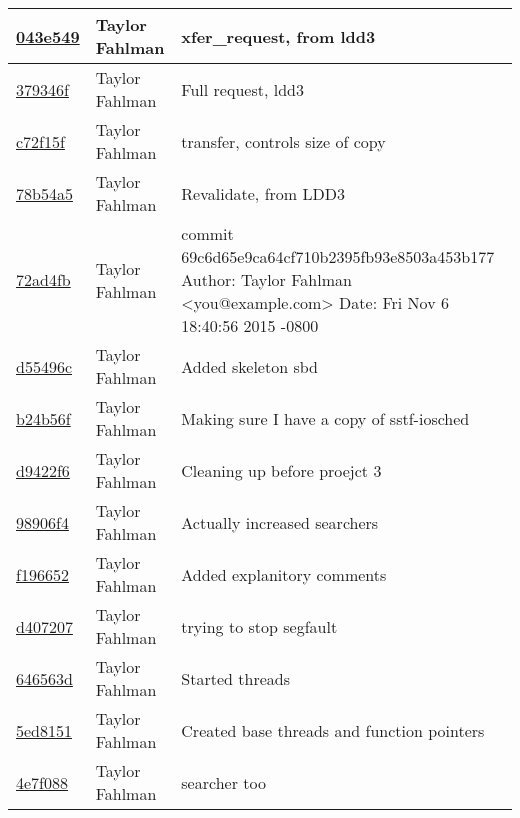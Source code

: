 \begin{tabular}{l l l}
\href{git@github.com:fahlmant/cs444/commit/043e5496aa11e70af81a109354acf313e04546f3}{043e549} & Taylor Fahlman & xfer_request, from ldd3\\\hline
\href{git@github.com:fahlmant/cs444/commit/379346f09f81f25716488cb6f078b36eb55ad95b}{379346f} & Taylor Fahlman & Full request, ldd3\\\hline
\href{git@github.com:fahlmant/cs444/commit/c72f15f69feb16d4c5c931a1ac1fa7bee9f50e54}{c72f15f} & Taylor Fahlman & transfer, controls size of copy\\\hline
\href{git@github.com:fahlmant/cs444/commit/78b54a5482e78e99c49671fc1bdfc4220cd15e69}{78b54a5} & Taylor Fahlman & Revalidate, from LDD3\\\hline
\href{git@github.com:fahlmant/cs444/commit/72ad4fb072c815d6c043cda034900290b946487f}{72ad4fb} & Taylor Fahlman & commit 69c6d65e9ca64cf710b2395fb93e8503a453b177 Author: Taylor Fahlman <you@example.com> Date:   Fri Nov 6 18:40:56 2015 -0800\\\hline
\href{git@github.com:fahlmant/cs444/commit/d55496cb5992fb77bf617407c1780b2bda22e95b}{d55496c} & Taylor Fahlman & Added skeleton sbd\\\hline
\href{git@github.com:fahlmant/cs444/commit/b24b56fd7a67cd25cae6c0711a306da74a8d7afd}{b24b56f} & Taylor Fahlman & Making sure I have a copy of sstf-iosched\\\hline
\href{git@github.com:fahlmant/cs444/commit/d9422f60653bf4faec3d8f4d7956d74635c64ec1}{d9422f6} & Taylor Fahlman & Cleaning up before proejct 3\\\hline
\href{git@github.com:fahlmant/cs444/commit/98906f41c1901e64ccfbd48175591f9cb4e3e564}{98906f4} & Taylor Fahlman & Actually increased searchers\\\hline
\href{git@github.com:fahlmant/cs444/commit/f1966525e032f176f800cde247991a191c6e96e8}{f196652} & Taylor Fahlman & Added explanitory comments\\\hline
\href{git@github.com:fahlmant/cs444/commit/d4072075c5ac343e9ba1d4fd53da5062d2db6b60}{d407207} & Taylor Fahlman & trying to stop segfault\\\hline
\href{git@github.com:fahlmant/cs444/commit/646563dfc803868c671fc00b9d63418021f4bfe2}{646563d} & Taylor Fahlman & Started threads\\\hline
\href{git@github.com:fahlmant/cs444/commit/5ed8151b742665756b9fde5e531f37ef0e50df03}{5ed8151} & Taylor Fahlman & Created base threads and function pointers\\\hline
\href{git@github.com:fahlmant/cs444/commit/4e7f0888594cdcc6ca918e340622a0c292855ef2}{4e7f088} & Taylor Fahlman & searcher too\\\hline

\end{tabular}

